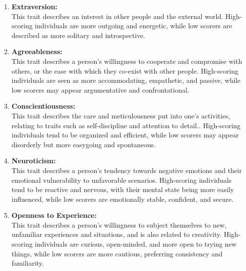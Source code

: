 \begin{enumerate}
	\item \textbf{Extraversion:} \\
	This trait describes an interest in other people and the external world. High-scoring individuals are more outgoing and energetic, while low scorers are described as more solitary and introspective. 
	\item \textbf{Agreeableness:} \\
 	This trait describes a person’s willingness to cooperate and compromise with others, or the ease with which they co-exist with other people. High-scoring individuals are seen as more accommodating, empathetic, and passive, while low scorers may appear argumentative and confrontational. 
	\item \textbf{Conscientiousness:} \\
	This trait describes the care and meticulousness put into one’s activities, relating to traits such as self-discipline and attention to detail.. High-scoring individuals tend to be organized and efficient, while low scorers may appear disorderly but more easygoing and spontaneous.
	\item \textbf{Neuroticism:} \\
	This trait describes a person’s tendency towards negative emotions and their emotional vulnerability to unfavorable scenarios. High-scoring individuals tend to be reactive and nervous, with their mental state being more easily influenced, while low scorers are emotionally stable, confident, and secure.
	\item \textbf{Openness to Experience:} \\
	This trait describes a person’s willingness to subject themselves to new, unfamiliar experiences and situations, and is also related to creativity. High-scoring individuals are curious, open-minded, and more open to trying new things, while low scorers are more cautious, preferring consistency and familiarity. 
\end{enumerate}


